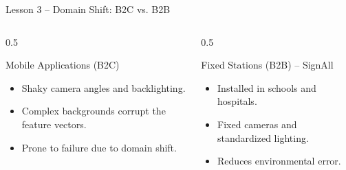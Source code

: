 \documentclass[aspectratio=169]{beamer}
\begin{document}
\begin{frame}{Lesson 3 -- Domain Shift: B2C vs. B2B}
    \begin{columns}[T]
        \begin{column}{0.5\textwidth}
            \begin{alertblock}{Mobile Applications (B2C)}
                \begin{itemize}
                    \item Shaky camera angles and backlighting.
                    \item Complex backgrounds corrupt the feature vectors.
                    \item Prone to failure due to domain shift.
                \end{itemize}
            \end{alertblock}
        \end{column}
        \begin{column}{0.5\textwidth}
            \begin{exampleblock}{Fixed Stations (B2B) -- SignAll}
                \begin{itemize}
                    \item Installed in schools and hospitals.
                    \item Fixed cameras and standardized lighting.
                    \item Reduces environmental error.
                \end{itemize}
            \end{exampleblock}
        \end{column}
    \end{columns}
\end{frame}

\end{document}
